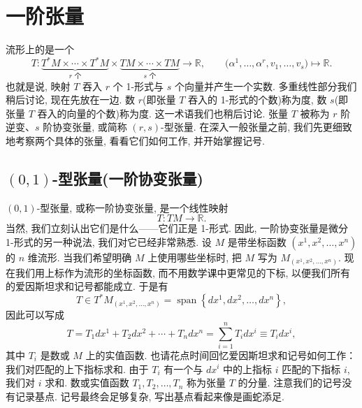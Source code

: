 \section{一阶张量}

流形上的是一个
\[
T:\underbrace{T^*M\times\cdots\times T^*M}_{r\text{ 个}}\times\underbrace{TM\times\cdots\times TM}_{s\text{ 个}}\to\mathbb{R},\qquad
\bigl(\alpha^1,\ldots,\alpha^r,v_1,\ldots,v_s\bigr)\mapsto\mathbb{R}.
\]
也就是说, 映射 $T$ 吞入 $r$ 个 1-形式与 $s$ 个向量并产生一个实数. 多重线性部分我们稍后讨论, 现在先放在一边. 数 $r$(即张量 $T$ 吞入的 1-形式的个数)称为度, 数 $s$(即张量 $T$ 吞入的向量的个数)称为度. 这一术语我们也稍后讨论. 张量 $T$ 被称为 $r$ 阶逆变、$s$ 阶协变张量, 或简称 $(r,s)$-型张量. 在深入一般张量之前, 我们先更细致地考察两个具体的张量, 看看它们如何工作, 并开始掌握记号.

\subsection{$(0,1)$-型张量(一阶协变张量)}

$(0,1)$-型张量, 或称一阶协变张量, 是一个线性映射
\[
T:TM\to\mathbb{R}.
\]
当然, 我们立刻认出它们是什么——它们正是 1-形式. 因此, 一阶协变张量是微分 1-形式的另一种说法, 我们对它已经非常熟悉. 设 $M$ 是带坐标函数 $(x^1,x^2,\ldots,x^n)$ 的 $n$ 维流形. 当我们希望明确 $M$ 上使用哪些坐标时, 把 $M$ 写为 $M_{(x^1,x^2,\ldots,x^n)}$. 现在我们用上标作为流形的坐标函数, 而不用数学课中更常见的下标, 以便我们所有的爱因斯坦求和记号都能成立. 于是有
\[
T\in T^*M_{(x^1,x^2,\ldots,x^n)}=\operatorname{span}\left\{dx^1,dx^2,\ldots,dx^n\right\},
\]
因此可以写成
\[
T=T_1dx^1+T_2dx^2+\cdots+T_ndx^n=\sum_{i=1}^{n}T_idx^i\equiv T_idx^i,
\]
其中 $T_i$ 是数或 $M$ 上的实值函数. 也请花点时间回忆爱因斯坦求和记号如何工作：我们对匹配的上下指标求和. 由于 $T_i$ 有一个与 $dx^i$ 中的上指标 $i$ 匹配的下指标 $i$, 我们对 $i$ 求和. 数或实值函数 $T_1,T_2,\ldots,T_n$ 称为张量 $T$ 的分量. 注意我们的记号没有记录基点. 记号最终会足够复杂, 写出基点看起来像是画蛇添足.


